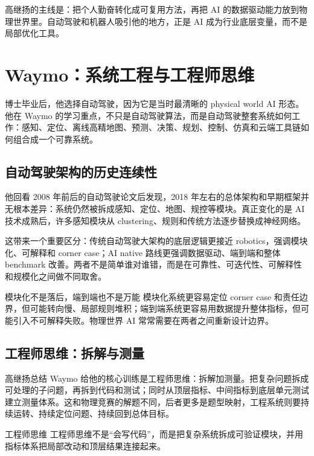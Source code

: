 \documentclass[a4paper]{article}
\begin{document}
高继扬的主线是：把个人勤奋转化成可复用方法，再把 AI 的数据驱动能力放到物理世界里。自动驾驶和机器人吸引他的地方，正是 AI 成为行业底层变量，而不是局部优化工具。

\section{Waymo：系统工程与工程师思维}

博士毕业后，他选择自动驾驶，因为它是当时最清晰的 physical world AI 形态。他在 Waymo 的学习重点，不只是自动驾驶算法，而是自动驾驶整套系统如何工作：感知、定位、离线高精地图、预测、决策、规划、控制、仿真和云端工具链如何组合成一个可靠系统。

\subsection{自动驾驶架构的历史连续性}

他回看 2008 年前后的自动驾驶论文后发现，2018 年左右的总体架构和早期框架并无根本差异：系统仍然被拆成感知、定位、地图、规控等模块。真正变化的是 AI 技术成熟后，许多感知模块从 clustering、规则和传统方法逐步替换成神经网络。

这带来一个重要区分：传统自动驾驶大架构的底层逻辑更接近 robotics，强调模块化、可解释和 corner case；AI native 路线更强调数据驱动、端到端和整体 benchmark 改善。两者不是简单谁对谁错，而是在可靠性、可迭代性、可解释性和规模化之间做不同取舍。

\begin{warningbox}{模块化不是落后，端到端也不是万能}
模块化系统更容易定位 corner case 和责任边界，但可能转向慢、局部规则堆积；端到端系统更容易用数据提升整体指标，但可能引入不可解释失败。物理世界 AI 常常需要在两者之间重新设计边界。
\end{warningbox}

\subsection{工程师思维：拆解与测量}

高继扬总结 Waymo 给他的核心训练是工程师思维：拆解加测量。把复杂问题拆成可处理的子问题，再拆到代码和测试；同时从顶层指标、中间指标到底层单元测试建立测量体系。这和物理竞赛的解题不同，后者更多是题型映射，工程系统则要持续运转、持续定位问题、持续回到总体目标。

\begin{importantbox}{工程师思维}
工程师思维不是“会写代码”，而是把复杂系统拆成可验证模块，并用指标体系把局部改动和顶层结果连接起来。
\end{importantbox}
\end{document}
